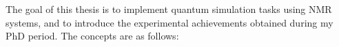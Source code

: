\begin{englishabstract}
The goal of this thesis is to implement quantum simulation tasks using NMR systems, and to introduce the experimental achievements obtained during my PhD period. The concepts are as follows:
\begin{enumerate}


\end{enumerate}
\end{englishabstract}
